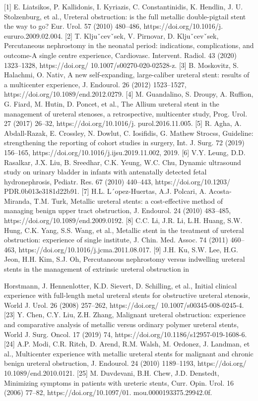[1] E. Liatsikos, P. Kallidonis, I. Kyriazis, C. Constantinidis, K. Hendlin, J. U. Stolzenburg, et al., Ureteral obstruction: is the full metallic double-pigtail stent the way to go? Eur. Urol. 57 (2010) 480–486, https://doi.org/10.1016/j. eururo.2009.02.004. [2] T. Kljuˇcevˇsek, V. Pirnovar, D. Kljuˇcevˇsek, Percutaneous nephrostomy in the neonatal period: indications, complications, and outcome-A single centre experience, Cardiovasc. Intervent. Radiol. 43 (2020) 1323–1328, https://doi.org/ 10.1007/s00270-020-02528-z. [3] B. Moskovitz, S. Halachmi, O. Nativ, A new self-expanding, large-caliber ureteral stent: results of a multicenter experience, J. Endourol. 26 (2012) 1523–1527, https://doi.org/10.1089/end.2012.0279. [4] M. Guandalino, S. Droupy, A. Ruffion, G. Fiard, M. Hutin, D. Poncet, et al., The Allium ureteral stent in the management of ureteral stenoses, a retrospective, multicenter study, Prog. Urol. 27 (2017) 26–32, https://doi.org/10.1016/j. purol.2016.11.005. [5] R. Agha, A. Abdall-Razak, E. Crossley, N. Dowlut, C. Iosifidis, G. Mathew Strocss, Guideline: strengthening the reporting of cohort studies in surgery, Int. J. Surg. 72 (2019) 156–165, https://doi.org/10.1016/j.ijsu.2019.11.002, 2019. [6] V.Y. Leung, D.D. Rasalkar, J.X. Liu, B. Sreedhar, C.K. Yeung, W.C. Chu, Dynamic ultrasound study on urinary bladder in infants with antenatally detected fetal hydronephrosis, Pediatr. Res. 67 (2010) 440–443, https://doi.org/10.1203/ PDR.0b013e3181d22b91. [7] H.L. L´opez-Huertas, A.J. Polcari, A. Acosta-Miranda, T.M. Turk, Metallic ureteral stents: a cost-effective method of managing benign upper tract obstruction, J. Endourol. 24 (2010) 483–485, https://doi.org/10.1089/end.2009.0192. [8] C.C. Li, J.R. Li, L.H. Huang, S.W. Hung, C.K. Yang, S.S. Wang, et al., Metallic stent in the treatment of ureteral obstruction: experience of single institute, J. Chin. Med. Assoc. 74 (2011) 460–463, https://doi.org/10.1016/j.jcma.2011.08.017. [9] J.H. Ku, S.W. Lee, H.G. Jeon, H.H. Kim, S.J. Oh, Percutaneous nephrostomy versus indwelling ureteral stents in the management of extrinsic ureteral obstruction in

Horstmann, J. Hennenlotter, K.D. Sievert, D. Schilling, et al., Initial clinical experience with full-length metal ureteral stents for obstructive ureteral stenosis, World J. Urol. 26 (2008) 257–262, https://doi.org/ 10.1007/s00345-008-0245-4. [23] Y. Chen, C.Y. Liu, Z.H. Zhang, Malignant ureteral obstruction: experience and comparative analysis of metallic versus ordinary polymer ureteral stents, World J. Surg. Oncol. 17 (2019) 74, https://doi.org/10.1186/s12957-019-1608-6. [24] A.P. Modi, C.R. Ritch, D. Arend, R.M. Walsh, M. Ordonez, J. Landman, et al., Multicenter experience with metallic ureteral stents for malignant and chronic benign ureteral obstruction, J. Endourol. 24 (2010) 1189–1193, https://doi.org/ 10.1089/end.2010.0121. [25] M. Duvdevani, B.H. Chew, J.D. Denstedt, Minimizing symptoms in patients with ureteric stents, Curr. Opin. Urol. 16 (2006) 77–82, https://doi.org/10.1097/01. mou.0000193375.29942.0f.

